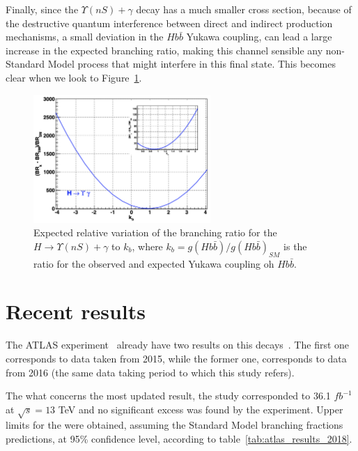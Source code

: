 Finally, since the $\Upsilon(nS) + \gamma$ decay has a much smaller cross section, because of the destructive quantum interference between direct and indirect production mechanisms, a small deviation in the $Hb\bar{b}$ Yukawa coupling, can lead a large increase in the expected branching ratio, making this channel sensible any non-Standard Model process that might interfere in this final state. This becomes clear when we look to Figure~\ref{hbb_coup}.

\begin{figure}[!htbp]
  \begin{center}
  \includegraphics[width=0.6\textwidth ]{figures/theory/hbb_coup.png}
  \end{center}\vspace*{-.5cm}
  \caption{Expected relative variation of the branching ratio for the $H \rightarrow \Upsilon(nS) + \gamma$ to $k_b$, where $k_b = g(Hb\bar{b})/g(Hb\bar{b})_{SM}$ is the ratio for the observed and expected Yukawa coupling oh $Hb\bar{b}$. \cite{PhysRevD.88.053003}}
  \label{hbb_coup}
  \end{figure}


\section{Recent results}

The ATLAS experiment~\cite{atlas_collaboration_2008} already have two results on this decays~\cite{atlas_paper:PhysRevLett.114.121801, atlas_paper_2018:2018txb}. The first one corresponds to data taken from 2015, while the former one, corresponds to data from 2016 (the same data taking period to which this study refers).

The what concerns the most updated result, the study corresponded to 36.1 $fb^{-1}$ at $\sqrt{s} = 13$ TeV and no significant excess was found by the experiment. Upper limits for the were obtained, assuming the Standard Model branching fractions predictions, at 95\% confidence level, according to table~\ref{tab:atlas_results_2018}.

